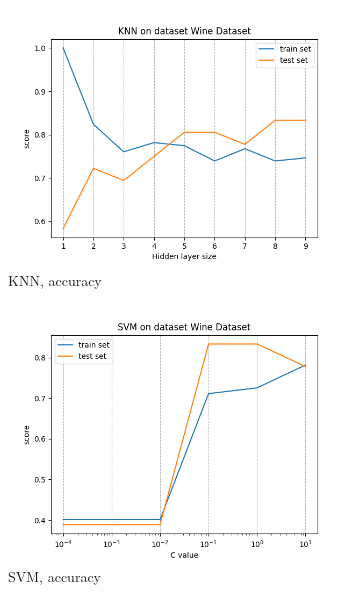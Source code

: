 \documentclass[12pt]{article}
\newcommand*{\subfigwidth}{0.24\textwidth}
\begin{document}
\begin{figure}[H]\centering
    \begin{subfigure}[t]{\subfigwidth}
        \includegraphics[width=\linewidth]{img/other_datasets/knn/wine_accuracy.png}
        \caption{KNN, accuracy}
    \end{subfigure}
    \hfill
    \begin{subfigure}[t]{\subfigwidth}
        \includegraphics[width=\linewidth]{img/other_datasets/svm/wine_accuracy.png}
        \caption{SVM, accuracy}
    \end{subfigure}
    \hfill
    \begin{subfigure}[t]{\subfigwidth}

\end{subfigure}
\end{figure}
\end{document}
